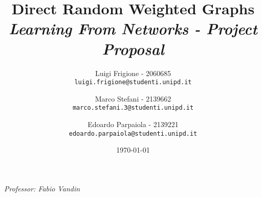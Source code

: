 \title{
    \textbf{Direct Random Weighted Graphs}\\[.5cm]
    
    {\large\emph{Learning From Networks - Project Proposal}}
}

\author{
  Luigi Frigione - 2060685\\
  \texttt{\small{luigi.frigione@studenti.unipd.it}}
  \and
  Marco Stefani - 2139662\\
  \texttt{\small{marco.stefani.3@studenti.unipd.it}}
  \and
  Edoardo Parpaiola - 2139221\\
  \texttt{\small{edoardo.parpaiola@studenti.unipd.it}}
}

\date{\today}

\maketitle

\vfill
{
    \emph{Professor: Fabio Vandin}
}    

